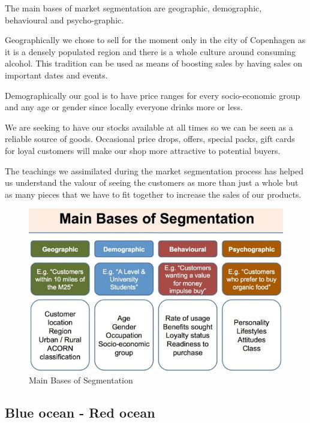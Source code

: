 \documentclass[12p]{article}
\begin{document}
The main bases of market segmentation are geographic, demographic, behavioural and psycho-graphic. 

Geographically we chose to sell for the moment only in the city of Copenhagen as it is a densely populated region and there is a whole culture around consuming alcohol. This tradition can be used as means of boosting sales by having sales on important dates and events.

Demographically our goal is to have price ranges for every socio-economic group and any age or gender since locally everyone drinks more or less.

We are seeking to have our stocks available at all times so we can be seen as a reliable source of goods. Occasional price drops, offers, special packs, gift cards for loyal customers will make our shop more attractive to potential buyers.

The teachings we assimilated during the market segmentation process has helped us understand the valour of seeing the customers as more than just a whole but as many pieces that we have to fit together to increase the sales of our products.

\begin{figure}
    \centering
    \includegraphics[width=1\textwidth]{market_segmentation}
    \caption{Main Bases of Segmentation \cite{MarketSegmentationBases}}
\end{figure}

\newpage


\subsection{Blue ocean - Red ocean} \label{BlueOceanRedOcean}
\end{document}
